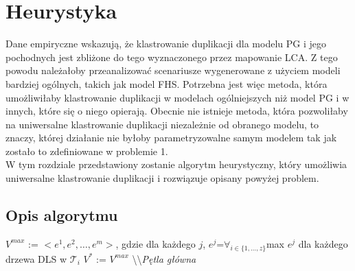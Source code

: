 \documentclass[licencjacka]{pracamgr}
\begin{document}
\chapter{Heurystyka}\label{r:heurystyka}
Dane empiryczne wskazują, że klastrowanie duplikacji dla modelu PG i jego pochodnych jest zbliżone do tego wyznaczonego przez mapowanie LCA. Z tego powodu należałoby przeanalizować scenariusze wygenerowane z użyciem modeli bardziej ogólnych, takich jak model FHS. Potrzebna jest więc metoda, która umożliwiłaby klastrowanie duplikacji w modelach ogólniejszych niż model PG i w innych, które się o niego opierają. 
Obecnie nie istnieje metoda, która pozwoliłaby na uniwersalne klastrowanie duplikacji niezależnie od obranego modelu, to znaczy, której działanie nie byłoby parametryzowalne samym modelem tak jak zostało to zdefiniowane w problemie 1. 
\\
W tym rozdziale przedstawiony zostanie algorytm heurystyczny, który umożliwia uniwersalne klastrowanie duplikacji i rozwiązuje opisany powyżej problem.

\section{Opis algorytmu}

\begin{algorithm}[H]
 $V^{max}$ := $<{e}^1,{e}^2, \dots , {e}^m>$, gdzie dla każdego $j$, ${e}^j$=$\forall_{i \in \{1,\dots,z\}}$max $e^j$ dla każdego drzewa DLS w $\mathcal{T}_i$\;
 $V^*$ := $V^{max}$\;
 \textbackslash\textbackslash \textit{Pętla główna}\;
\end{algorithm}
\end{document}
